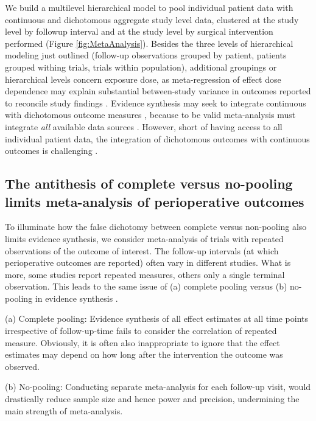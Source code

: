 \documentclass[11pt,notitlepage]{article}
\begin{document}
We build a multilevel hierarchical model to pool individual patient data with continuous and 
dichotomous aggregate study level data, clustered at the study level by followup interval and at the study level by surgical 
intervention performed (Figure \ref{fig:MetaAnalysis}). Besides the three levels of hierarchical modeling just outlined 
(follow-up observations grouped by patient, patients grouped withing trials, trials within population), additional groupings 
or hierarchical levels concern exposure dose, as meta-regression of effect dose dependence may explain substantial between-study 
variance in outcomes reported to reconcile study findings \cite{Andreae2015}. Evidence synthesis may seek to integrate continuous 
with dichotomous outcome measures \cite{AndreaeJohnsonAbstract2013}, because to be valid meta-analysis must 
integrate \textit{all} 
available data sources \cite{Deeks2011chapter}. However, short of having access to all individual patient data, 
the integration of dichotomous outcomes with continuous outcomes is challenging \cite{Andreae2015, Roth2015CriticalCare}. 

\subsection*{The antithesis of complete versus no-pooling limits meta-analysis of perioperative outcomes}
To illuminate how the false dichotomy between complete versus non-pooling also limits evidence 
synthesis, we consider meta-analysis of trials with repeated observations of the outcome of interest. 
The follow-up intervals (at which perioperative outcomes are reported) 
often vary in different studies. What is more, some studies report repeated measures, 
others only a single terminal observation. This 
leads to the same issue of (a) complete pooling versus (b) no-pooling in evidence synthesis 
\cite{Roth2015CriticalCare}.

(a) Complete pooling:
Evidence synthesis of all effect estimates at all time points irrespective of follow-up-time 
fails to consider the correlation of repeated measure. Obviously, it is often also inappropriate 
to ignore that the effect estimates may depend on how long after the intervention the outcome was observed.

(b) No-pooling: Conducting separate meta-analysis for each follow-up visit, would drastically reduce sample size and hence 
power and precision, undermining the main strength of meta-analysis.
\end{document}
